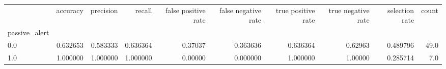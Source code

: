 \begin{tabular}{lrrrrrrrrr}
\toprule
{} &  accuracy &  precision &    recall &  false positive rate &  false negative rate &  true positive rate &  true negative rate &  selection rate &  count \\
passive\_alert &           &            &           &                      &                      &                     &                     &                 &        \\
\midrule
0.0           &  0.632653 &   0.583333 &  0.636364 &              0.37037 &             0.363636 &            0.636364 &             0.62963 &        0.489796 &   49.0 \\
1.0           &  1.000000 &   1.000000 &  1.000000 &              0.00000 &             0.000000 &            1.000000 &             1.00000 &        0.285714 &    7.0 \\
\bottomrule
\end{tabular}
